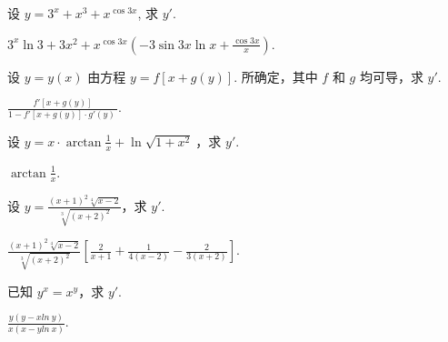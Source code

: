 \begin{problem} 设 $y=3^{x} + x^{3} + x^{\cos 3x}$, 求 $y'$.

\begin{solution}
$\displaystyle 3^{x}\ln 3 + 3x^{2} + x^{\cos 3x}\left( - 3\sin 3x\ln x + \frac{\cos 3x}{x} \right)$.
\end{solution}
\end{problem}

\begin{problem} 
	设 $y = y(x)$ 由方程 $y = f\left[ x + g\left( y \right)\right]$.
所确定，其中 $f$ 和 $g$ 均可导，求 $y'$.

\begin{solution}
$\displaystyle \frac{f'\left[ x + g\left( y \right)\right]}{1 - f'\left[ x + g(y)\right] \cdot g'(y)\ }$.
\end{solution}

\end{problem}

\begin{problem}
	 设 $y = x \cdot \arctan\frac{1}{x} + \ln{\sqrt{1 + x^{2}}\ }$，求
$y'$.

\begin{solution}
 $\displaystyle \arctan\frac{1}{x}$.
\end{solution}

\end{problem}

\begin{problem}
	设
$\displaystyle y = \frac{(x + 1)^{2}\sqrt[4]{x - 2}}{\sqrt[3]{(x + 2)^{2}}}$，求
$y'$.

\begin{solution}
$\displaystyle \frac{(x + 1)^{2}\sqrt[4]{x - 2}}{\sqrt[3]{(x + 2)^{2}}}\left[ \frac{2}{x + 1} + \frac{1}{4(x - 2)} - \frac{2}{3(x + 2)} \right]$.
\end{solution}

\end{problem}

\begin{problem}
	已知 $\displaystyle y^{x} = x^{y}$，求 $y'$.

\begin{solution}
	$\displaystyle \frac{y(y - xln\ y)}{x(x - yln\ x)}$.
\end{solution}

\end{problem}

